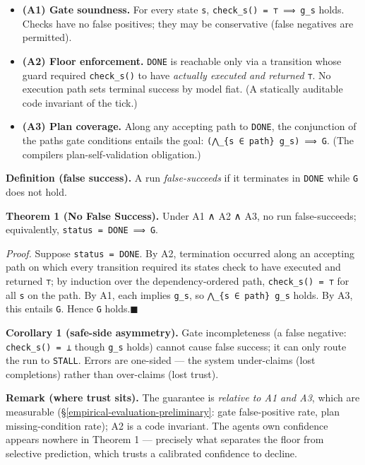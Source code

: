 \begin{itemize}
\tightlist
\item
  \textbf{(A1) Gate soundness.} For every state \texttt{s}, \texttt{check\_s()\ =\ ⊤\ ⟹\ g\_s} holds. Checks have no false
  positives; they may be conservative (false negatives are permitted).
\item
  \textbf{(A2) Floor enforcement.} \texttt{DONE} is reachable only via a transition whose guard required
  \texttt{check\_s()} to have \emph{actually executed and returned} \texttt{⊤}. No execution path sets terminal success by
  model fiat. (A statically auditable code invariant of the tick.)
\item
  \textbf{(A3) Plan coverage.} Along any accepting path to \texttt{DONE}, the conjunction of the path\textquotesingle s gate
  conditions entails the goal: \texttt{(⋀\_\{s\ ∈\ path\}\ g\_s)\ ⟹\ G}. (The compiler\textquotesingle s plan-self-validation obligation.)
\end{itemize}

\textbf{Definition (false success).} A run \emph{false-succeeds} if it terminates in \texttt{DONE} while \texttt{G} does not hold.

\textbf{Theorem 1 (No False Success).} Under A1 ∧ A2 ∧ A3, no run false-succeeds; equivalently,
\texttt{status\ =\ DONE\ ⟹\ G}.

\emph{Proof.} Suppose \texttt{status\ =\ DONE}. By A2, termination occurred along an accepting path on which every
transition required its state\textquotesingle s check to have executed and returned \texttt{⊤}; by induction over the
dependency-ordered path, \texttt{check\_s()\ =\ ⊤} for all \texttt{s} on the path. By A1, each implies \texttt{g\_s}, so
\texttt{⋀\_\{s\ ∈\ path\}\ g\_s} holds. By A3, this entails \texttt{G}. Hence \texttt{G} holds.\hfill\ensuremath{\blacksquare}

\textbf{Corollary 1 (safe-side asymmetry).} Gate incompleteness (a false negative: \texttt{check\_s()\ =\ ⊥} though
\texttt{g\_s} holds) cannot cause false success; it can only route the run to \texttt{STALL}. Errors are one-sided ---
the system under-claims (lost completions) rather than over-claims (lost trust).

\textbf{Remark (where trust sits).} The guarantee is \emph{relative to A1 and A3}, which are measurable
(\S\ref{empirical-evaluation-preliminary}: gate false-positive rate, plan missing-condition rate); A2 is a code invariant. The agent\textquotesingle s
own confidence appears nowhere in Theorem 1 --- precisely what separates the floor from selective
prediction, which trusts a calibrated confidence to decline.



